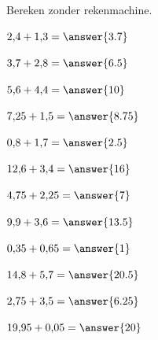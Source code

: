 \documentclass{ximera}
\begin{document}
\begin{oefening}{\oefB\ESS}

Bereken zonder rekenmachine.

\begin{question} \(2{,}4+1{,}3=\answer{3.7}\) \end{question}

\begin{question} \(3{,}7+2{,}8=\answer{6.5}\) \end{question}

\begin{question} \(5{,}6+4{,}4=\answer{10}\) \end{question}

\begin{question} \(7{,}25+1{,}5=\answer{8.75}\) \end{question}

\begin{question} \(0{,}8+1{,}7=\answer{2.5}\) \end{question}

\begin{question} \(12{,}6+3{,}4=\answer{16}\) \end{question}

\begin{question} \(4{,}75+2{,}25=\answer{7}\) \end{question}

\begin{question} \(9{,}9+3{,}6=\answer{13.5}\) \end{question}

\begin{question} \(0{,}35+0{,}65=\answer{1}\) \end{question}

\begin{question} \(14{,}8+5{,}7=\answer{20.5}\) \end{question}

\begin{question} \(2{,}75+3{,}5=\answer{6.25}\) \end{question}

\begin{question} \(19{,}95+0{,}05=\answer{20}\) \end{question}

\end{oefening}
\end{document}
